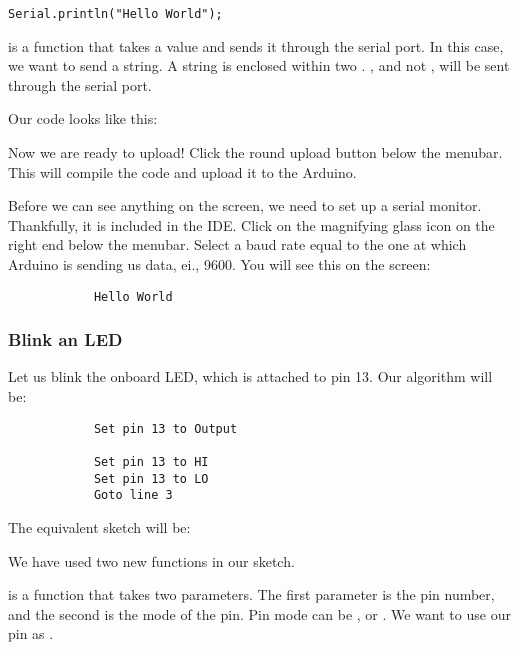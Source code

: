 \documentclass{article}
\begin{document}
			\begin{lstlisting}[firstnumber = 4]
			Serial.println("Hello World");
			\end{lstlisting}

			 is a function that takes a value and sends it through the serial port. In this case, we want to send a string. A string is enclosed within two . , and not , will be sent through the serial port.

			Our code looks like this:

			

			Now we are ready to upload! Click the round upload button below the menubar. This will compile the code and upload it to the Arduino.

			Before we can see anything on the screen, we need to set up a serial monitor. Thankfully, it is included in the IDE. Click on the magnifying glass icon on the right end below the menubar. Select a baud rate equal to the one at which Arduino is sending us data, ei., 9600. You will see this on the screen:

			\begin{lstlisting}
			Hello World
			\end{lstlisting}

		\subsubsection{Blink an LED}

			Let us blink the onboard LED, which is attached to pin 13. Our algorithm will be:

			\begin{lstlisting}
			Set pin 13 to Output

			Set pin 13 to HI
			Set pin 13 to LO
			Goto line 3
			\end{lstlisting}

			The equivalent sketch will be:

			

			We have used two new functions in our sketch.

			 is a function that takes two parameters. The first parameter is the pin number, and the second is the mode of the pin. Pin mode can be  ,  or . We want to use our pin as .
\end{document}
